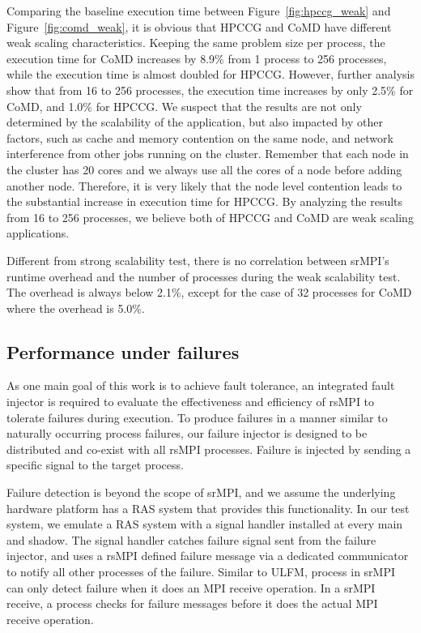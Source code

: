 Comparing the baseline execution time between Figure~\ref{fig:hpccg_weak} and Figure~\ref{fig:comd_weak}, it is obvious that HPCCG and CoMD have different weak scaling characteristics. Keeping the same problem size per process, the execution time for CoMD increases by 8.9\% from 1 process to 256 processes, while the execution time is almost doubled for HPCCG. However, further analysis show that from 16 to 256 processes, the execution time increases by only 2.5\% for CoMD, and 1.0\% for HPCCG. We suspect that the results are not only determined by the scalability of the application, but also impacted by other factors, such as cache and memory contention on the same node, and network interference from other jobs running on the cluster. Remember that each node in the cluster has 20 cores and we always use all the cores of a node before adding another node. Therefore, it is very likely that the node level contention leads to the substantial increase in execution time for HPCCG. By analyzing the results from 16 to 256 processes, we believe both of HPCCG and CoMD are weak scaling applications. 

Different from strong scalability test, there is no correlation between srMPI's runtime overhead and the number of processes during the weak scalability test. The overhead is always below 2.1\%, except for the case of 32 processes for CoMD where the overhead is 5.0\%. %

\subsection{Performance under failures}

As one main goal of this work is to achieve fault tolerance, an integrated fault injector is required to evaluate the effectiveness and efficiency of rsMPI to tolerate failures during execution. To produce failures in a manner similar to naturally occurring process failures, our failure injector is designed to be distributed and co-exist with all rsMPI processes. Failure is injected by sending a specific signal to the target process.

Failure detection is beyond the scope of srMPI, and we assume the underlying hardware platform has a RAS system that provides this functionality. In our test system, we emulate a RAS system with a signal handler installed at every main and shadow. The signal handler catches failure signal sent from the failure injector, and uses a rsMPI defined failure message via a dedicated communicator to notify all other processes of the failure. 
Similar to ULFM, process in srMPI can only detect failure when it does an MPI receive operation. In a srMPI receive, 
a process checks for failure messages before it does the actual MPI receive operation.

